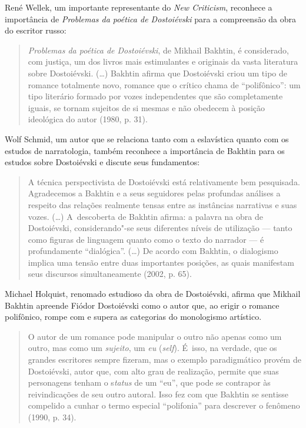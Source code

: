 René Wellek, um importante representante do \emph{New Criticism},
reconhece a importância de \emph{Problemas da poética de Dostoiévski}
para a compreensão da obra do escritor russo:

\begin{quote}
\emph{Problemas da poética de Dostoiévski}, de Mikhail Bakhtin, é
considerado, com justiça, um dos livros mais estimulantes e originais da
vasta literatura sobre Dostoiévski. (\ldots) Bakhtin afirma que Dostoiévski
criou um tipo de romance totalmente novo, romance que o crítico chama de
``polifônico'': um tipo literário formado por vozes independentes que
são completamente iguais, se tornam sujeitos de si mesmas e não obedecem
à posição ideológica do autor (1980, p. 31).
\end{quote}

Wolf Schmid, um autor que se relaciona tanto com a eslavística quanto
com os estudos de narratologia, também reconhece a importância de
Bakhtin para os estudos sobre Dostoiévski e discute seus fundamentos:

\begin{quote}
A técnica perspectivista de Dostoiévski está relativamente bem
pesquisada. Agradecemos a Bakhtin e a seus seguidores pelas profundas
análises a respeito das relações realmente tensas entre as instâncias
narrativas e suas vozes. (\ldots) A~descoberta de Bakhtin afirma: a palavra
na obra de Dostoiévski, considerando"-se seus diferentes níveis de
utilização --- tanto como figuras de linguagem quanto como o texto do
narrador --- é profundamente ``dialógica''. (\ldots) De acordo com Bakhtin,
o dialogismo implica uma tensão entre duas importantes posições, as
quais manifestam seus discursos simultaneamente (2002, p. 65).
\end{quote}

Michael Holquist, renomado estudioso da obra de Dostoiévski, afirma que
Mikhail Bakhtin apreende Fiódor Dostoiévski como o autor que, ao erigir
o romance polifônico, rompe com e supera as categorias do monologismo
artístico.

\begin{quote}
O autor de um romance pode manipular o outro não apenas como um outro,
mas como um \emph{sujeito}, um \emph{eu} (\emph{self}). É~isso, na
verdade, que os grandes escritores sempre fizeram, mas o exemplo
paradigmático provém de Dostoiévski, autor que, com alto grau de
realização, permite que suas personagens tenham o s\emph{tatus} de um
``eu'', que pode se contrapor às reivindicações de seu outro autoral.
Isso fez com que Bakhtin se sentisse compelido a cunhar o termo especial
``polifonia'' para descrever o fenômeno (1990, p. 34).
\end{quote}

